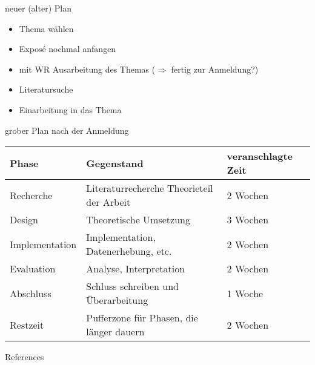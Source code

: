 \documentclass{beamer}
\begin{document}
\begin{frame}{neuer (alter) Plan}
	\begin{itemize}
		\item Thema wählen
	    \item Exposé nochmal anfangen
        \item mit WR Ausarbeitung des Themas (\(\Rightarrow\) fertig zur Anmeldung?)
		\item Literatursuche
    	\item Einarbeitung in das Thema
	\end{itemize}
\end{frame}

\begin{frame}{grober Plan nach der Anmeldung}
	\begin{tabular}[ht]{|l|p{4cm}|l|}
		\hline
		\textbf{Phase} & \textbf{Gegenstand} & \textbf{veranschlagte Zeit} \\ \hline
		Recherche & Literaturrecherche \newline Theorieteil der Arbeit & 2 Wochen \\ \hline
		Design & Theoretische Umsetzung & 3 Wochen \\ \hline
		Implementation & Implementation, \newline Datenerhebung, etc. & 2 Wochen \\ \hline
		Evaluation & Analyse, \newline Interpretation & 2 Wochen \\ \hline
		Abschluss & Schluss schreiben und Überarbeitung & 1 Woche \\ \hline
		Restzeit & Pufferzone für Phasen, die länger dauern & 2 Wochen \\ \hline
	\end{tabular}
\end{frame}

\begin{frame}[shrink=10]{References}
\nocite{*}

 
\end{frame}
\end{document}
